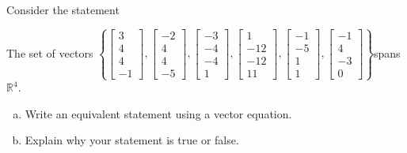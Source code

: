
\begin{exerciseStatement}


Consider the statement 
\begin{center}\begin{minipage}{0.8\textwidth}
 The set of vectors \( \left\{ \left[\begin{array}{c}
3 \\
4 \\
4 \\
-1
\end{array}\right] , \left[\begin{array}{c}
-2 \\
4 \\
4 \\
-5
\end{array}\right] , \left[\begin{array}{c}
-3 \\
-4 \\
-4 \\
1
\end{array}\right] , \left[\begin{array}{c}
1 \\
-12 \\
-12 \\
11
\end{array}\right] , \left[\begin{array}{c}
-1 \\
-5 \\
1 \\
1
\end{array}\right] , \left[\begin{array}{c}
-1 \\
4 \\
-3 \\
0
\end{array}\right] \right\} \)spans \(\mathbb{R}^4\). 
\end{minipage}\end{center}
    


\begin{enumerate}[(a)]
\item  Write an equivalent statement using a vector equation.
\item  Explain why your statement is true or false.
\end{enumerate}
    
\end{exerciseStatement}
    
